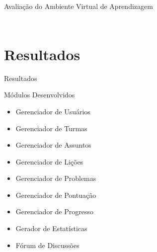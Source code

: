 \documentclass[aspectratio=169]{beamer}
\begin{document}
\begin{frame}{Avaliação do Ambiente Virtual de Aprendizagem}
\begin{columns}
\begin{column}{0.8\textwidth}
\end{column}
\begin{column}{0.2\textwidth}  %

\begin{table}[H]
\centering
\label{my-label}


\end{table}

\end{column}
\end{columns}


\end{frame}

\section{Resultados}
\begin{frame}{Resultados}

\begin{block}{Módulos Desenvolvidos}
	\begin{itemize}
		\item Gerenciador de Usuários
		\item Gerenciador de Turmas
		\item Gerenciador de Assuntos
		\item Gerenciador de Lições
		\item Gerenciador de Problemas
		\item Gerenciador de Pontuação
		\item Gerenciador de Progresso
		\item Gerador de Estatísticas
		\item F\'orum de Discussões
	\end{itemize}
\end{block}

\end{frame}
\end{document}
